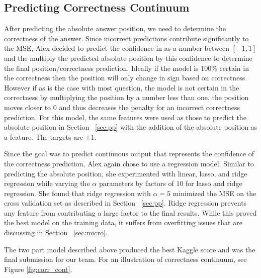 \documentclass[letterpaper]{article}
\begin{document}
\subsection{Predicting Correctness Continuum}
\label{sec:pc}
After predicting the absolute answer position, we need to determine the correctness of the answer.  Since incorrect predictions contribute significantly to the MSE, Alex decided to predict the confidence in as a number between $[-1,1]$ and the multiply the predicted absolute position by this confidence to determine the final position/correctness prediction.  Ideally if the model is 100\% certain in the correctness then the position will only change in sign based on correctness.  However if as is the case with most question, the model is not certain in the correctness by multiplying the position by a number less than one, the position moves closer to 0 and thus decreases the penalty for an incorrect correctness prediction.  For this model, the same features were used as those to predict the absolute position in Section ~\ref{sec:pp} with the addition of the absolute position as a feature.  The targets are $\pm 1$.

Since the goal was to predict continuous output that represents the confidence of the correctness prediction, Alex again chose to use a regression model.  Similar to predicting the absolute position, she experimented with linear, lasso, and ridge regression while varying the $\alpha$ parameters by factors of $10$ for lasso and ridge regression.  She found that ridge regression with $\alpha=5$ minimized the MSE on the cross validation set as described in Section ~\ref{sec:pp}.  Ridge regression prevents any feature from contributing a large factor to the final results.  While this proved the best model on the training data, it suffers from overfitting issues that are discussing in Section ~\ref{sec:micro}.

The two part model described above produced the best Kaggle score and was the final submission for our team.  For an illustration of correctness continuum, see Figure \ref{fig:corr_cont}.  
\end{document}
